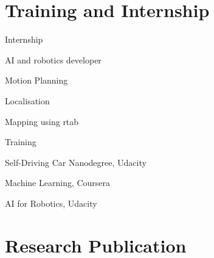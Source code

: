 \documentclass[11pt,a4paper,sans]{moderncv}        %
\begin{document}
\section{Training and Internship}
\begin{itemize}
{\setlength\itemindent{120pt} \item Internship}
	\begin{itemize}
	{\setlength\itemindent{120pt} \item AI and robotics developer}	
		\begin{itemize}
		{\setlength\itemindent{120pt} \item Motion Planning}
		{\setlength\itemindent{120pt} \item Localisation}
		{\setlength\itemindent{120pt} \item Mapping using rtab}	
		\end{itemize}
	\end{itemize}
{\setlength\itemindent{120pt} \item Training}
	\begin{itemize}
		{\setlength\itemindent{120pt} \item Self-Driving Car Nanodegree, Udacity}
		{\setlength\itemindent{120pt} \item Machine Learning, Coursera}
		{\setlength\itemindent{120pt} \item AI for Robotics, Udacity}
	\end{itemize}
\end{itemize}

\section{Research Publication}
\end{document}
